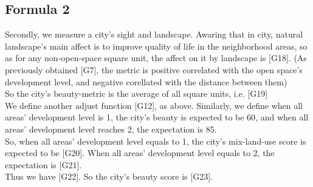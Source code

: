 \subsection{Formula 2}
Secondly, we measure a city's sight and landscape.
Awaring that in city, natural landscape's main affect is to improve quality of life in the neighborhood areas, so as for any non-open-space square unit, the affect on it by landscape is [G18].
(As previously obtained [G7], the metric is positive correlated with the open space's development level, and negative corellated with the distance between them)
\\
So the city's beauty-metric is the average of all square units, i.e. [G19]
\\
We define another adjust function [G12], as above.
Similarly, we define when all areas' development level is 1, the city's beauty is expected to be 60, and when all areas' development level reaches 2, the expectation is 85.
\\
So, when all areas' development level equals to 1, the city's mix-land-use score is expected to be [G20].
When all areas' development level equals to 2, the expectation is [G21].
\\
Thus we have [G22].
So the city's beauty score is [G23].
\\
